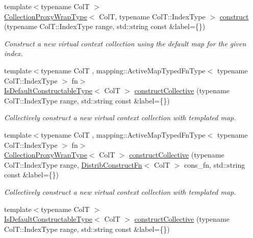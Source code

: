 \begin{DoxyCompactItemize}
{\footnotesize template$<$typename ColT $>$ }\\\hyperlink{structvt_1_1vrt_1_1collection_1_1_collection_manager_a56458ed7f9bb22b631b9b3a745f42f94}{Collection\+Proxy\+Wrap\+Type}$<$ ColT, typename Col\+T\+::\+Index\+Type $>$ \hyperlink{structvt_1_1vrt_1_1collection_1_1_collection_manager_a14e19098a1e676d5229fc00a2f0cc133}{construct} (typename Col\+T\+::\+Index\+Type range, std\+::string const \&label=\{\})
\begin{DoxyCompactList}\small\item\em Construct a new virtual context collection using the default map for the given index. \end{DoxyCompactList}\item 
{\footnotesize template$<$typename ColT , mapping\+::\+Active\+Map\+Typed\+Fn\+Type$<$ typename Col\+T\+::\+Index\+Type $>$ fn$>$ }\\\hyperlink{structvt_1_1vrt_1_1collection_1_1_collection_manager_af8091fcb8218dad155ea028c9b5d283f}{Is\+Default\+Constructable\+Type}$<$ ColT $>$ \hyperlink{structvt_1_1vrt_1_1collection_1_1_collection_manager_a9df5c1771c8112c60e45d57d5c530ba8}{construct\+Collective} (typename Col\+T\+::\+Index\+Type range, std\+::string const \&label=\{\})
\begin{DoxyCompactList}\small\item\em Collectively construct a new virtual context collection with templated map. \end{DoxyCompactList}\item 
{\footnotesize template$<$typename ColT , mapping\+::\+Active\+Map\+Typed\+Fn\+Type$<$ typename Col\+T\+::\+Index\+Type $>$ fn$>$ }\\\hyperlink{structvt_1_1vrt_1_1collection_1_1_collection_manager_a56458ed7f9bb22b631b9b3a745f42f94}{Collection\+Proxy\+Wrap\+Type}$<$ ColT $>$ \hyperlink{structvt_1_1vrt_1_1collection_1_1_collection_manager_a29a9ac1bd384ac328bb149212676b751}{construct\+Collective} (typename Col\+T\+::\+Index\+Type range, \hyperlink{structvt_1_1vrt_1_1collection_1_1_collection_manager_a9ef5ab71e344fdee8525c3f18241c305}{Distrib\+Construct\+Fn}$<$ ColT $>$ cons\+\_\+fn, std\+::string const \&label=\{\})
\begin{DoxyCompactList}\small\item\em Collectively construct a new virtual context collection with templated map. \end{DoxyCompactList}\item 
{\footnotesize template$<$typename ColT $>$ }\\\hyperlink{structvt_1_1vrt_1_1collection_1_1_collection_manager_af8091fcb8218dad155ea028c9b5d283f}{Is\+Default\+Constructable\+Type}$<$ ColT $>$ \hyperlink{structvt_1_1vrt_1_1collection_1_1_collection_manager_a2dcf5a95489eee7ec79fc1ffdd528db2}{construct\+Collective} (typename Col\+T\+::\+Index\+Type range, std\+::string const \&label=\{\})

\end{DoxyCompactItemize}
